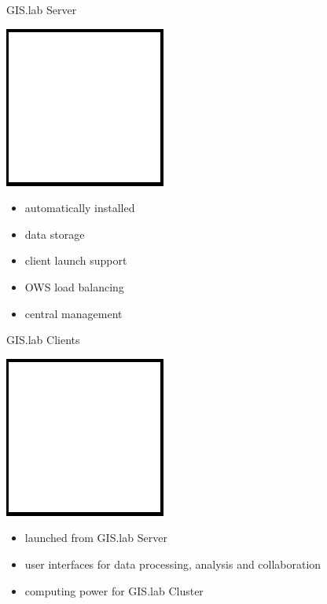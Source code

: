 \documentclass[12pt]{beamer}
\begin{document}
\begin{frame}{GIS.lab Server}
	\begin{center}
		\includegraphics[keepaspectratio=true,height=0.5\textheight]{images/image.png}
	\end{center}
	\begin{itemize}
		\item automatically installed
		\item data storage
		\item client launch support
		\item OWS load balancing
		\item central management
	\end{itemize}
\end{frame}

\begin{frame}{GIS.lab Clients}
	\begin{center}
		\includegraphics[keepaspectratio=true,height=0.5\textheight]{images/image.png}
	\end{center}
	\begin{itemize}
		\item launched from GIS.lab Server 
		\item user interfaces for data processing, analysis and collaboration
		\item computing power for GIS.lab Cluster
	\end{itemize}
\end{frame}
\end{document}
